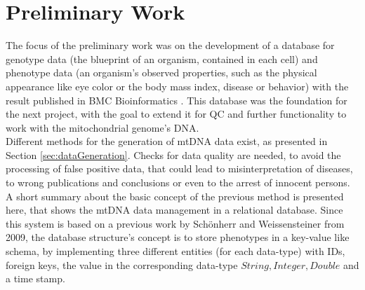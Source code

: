 \section{Preliminary Work}
\label{prelimWork}
The focus of the preliminary work was on the development of a database for genotype data (the blueprint of an organism, contained in each cell) and phenotype data (an organism's observed properties, such as the physical appearance like eye color or the body mass index, disease or behavior) with the result published in BMC Bioinformatics \cite{Schoenherr2009}. This database was the foundation for the next project, with the goal to extend it for QC and further functionality to work with the mitochondrial genome's DNA. 
\\
Different methods for the generation of mtDNA data exist, as presented in Section \ref{sec:dataGeneration}. Checks for data quality are needed, to avoid the processing of false positive data, that could lead to misinterpretation of diseases, to wrong publications and conclusions or even to the arrest of innocent persons.
A short summary about the basic concept of the previous method is presented here, that shows the mtDNA data management in a relational database. Since this system is based on a previous work by Sch\"onherr and Weissensteiner \cite{Schoenherr2009} from 2009, the database structure's concept is to store phenotypes in a key-value like schema, by implementing three different entities (for each data-type)  with IDs, foreign keys, the value in the corresponding data-type $String, Integer, Double$ and a time stamp.
